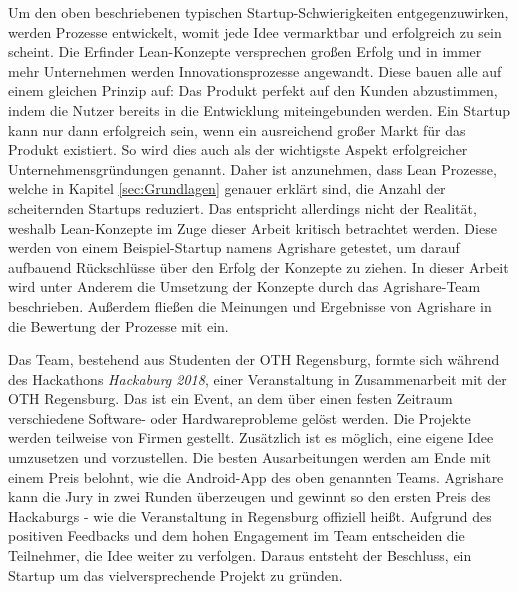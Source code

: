 Um den oben beschriebenen typischen Startup-Schwierigkeiten entgegenzuwirken, werden Prozesse entwickelt, womit jede Idee vermarktbar und erfolgreich zu sein scheint. Die Erfinder Lean-Konzepte versprechen großen Erfolg und in immer mehr Unternehmen werden Innovationsprozesse angewandt. Diese bauen alle auf einem gleichen Prinzip auf: Das Produkt perfekt auf den Kunden abzustimmen, indem die Nutzer bereits in die Entwicklung miteingebunden werden. Ein Startup kann nur dann erfolgreich sein, wenn ein ausreichend großer Markt für das Produkt existiert. So wird dies auch als der wichtigste Aspekt erfolgreicher Unternehmensgründungen genannt. Daher ist anzunehmen, dass Lean Prozesse, welche in Kapitel \ref{sec:Grundlagen} genauer erklärt sind, die Anzahl der scheiternden Startups reduziert. Das entspricht allerdings nicht der Realität, weshalb Lean-Konzepte im Zuge dieser Arbeit kritisch betrachtet werden.\cite{patel201590} Diese werden von einem Beispiel-Startup namens Agrishare getestet, um darauf aufbauend Rückschlüsse über den Erfolg der Konzepte zu ziehen. In dieser Arbeit wird unter Anderem die Umsetzung der Konzepte durch das Agrishare-Team beschrieben. Außerdem fließen die Meinungen und Ergebnisse von Agrishare in die Bewertung der Prozesse mit ein.

Das Team, bestehend aus Studenten der OTH Regensburg, formte sich während des Hackathons \textit{Hackaburg 2018}, einer Veranstaltung in Zusammenarbeit mit der OTH Regensburg. Das ist ein Event, an dem über einen festen Zeitraum verschiedene Software- oder Hardwareprobleme gelöst werden. Die Projekte werden teilweise von Firmen gestellt. Zusätzlich ist es möglich, eine eigene Idee umzusetzen und vorzustellen. Die besten Ausarbeitungen werden am Ende mit einem Preis belohnt, wie die Android-App des oben genannten Teams. Agrishare kann die Jury in zwei Runden überzeugen und gewinnt so den ersten Preis des Hackaburgs - wie die Veranstaltung in Regensburg offiziell heißt. Aufgrund des positiven Feedbacks und dem hohen Engagement im Team entscheiden die Teilnehmer, die Idee weiter zu verfolgen. Daraus entsteht der Beschluss, ein Startup um das vielversprechende Projekt zu gründen.

\newpage

